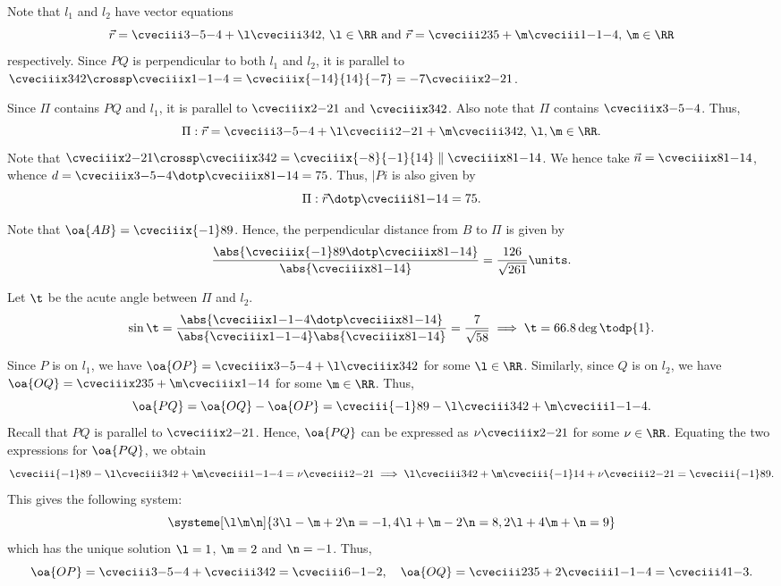 \begin{solution}
    \begin{ppart}
        Note that $l_1$ and $l_2$ have vector equations \[\vec r = \cveciii3{-5}{-4} + \l\cveciii342, \, \l \in \RR \text{ and } \vec r = \cveciii235 + \m\cveciii1{-1}{-4}, \, \m \in \RR\] respectively. Since $PQ$ is perpendicular to both $l_1$ and $l_2$, it is parallel to $\cveciiix342 \crossp \cveciiix1{-1}{-4} = \cveciiix{-14}{14}{-7} = -7\cveciiix2{-2}1$.
    \end{ppart}
    \begin{ppart}
        Since $\Pi$ contains $PQ$ and $l_1$, it is parallel to $\cveciiix2{-2}1$ and $\cveciiix342$. Also note that $\Pi$ contains $\cveciiix3{-5}{-4}$. Thus, \[\Pi : \vec r = \cveciii3{-5}{-4} + \l \cveciii2{-2}1 + \m \cveciii342, \, \l, \m \in \RR.\] Note that $\cveciiix2{-2}1 \crossp \cveciiix342 = \cveciiix{-8}{-1}{14} \parallel \cveciiix81{-14}$. We hence take $\vec n = \cveciiix81{-14}$, whence $d = \cveciiix3{-5}{-4} \dotp \cveciiix81{-14} = 75$. Thus, $|Pi$ is also given by \[\Pi: \vec r \dotp \cveciii81{-14} = 75.\]
    \end{ppart}
    \begin{ppart}
        Note that $\oa{AB} = \cveciiix{-1}89$. Hence, the perpendicular distance from $B$ to $\Pi$ is given by \[\frac{\abs{\cveciiix{-1}89 \dotp \cveciiix81{-14}}}{\abs{\cveciiix81{-14}}} = \frac{126}{\sqrt{261}} \units.\]
    \end{ppart}
    \begin{ppart}
        Let $\t$ be the acute angle between $\Pi$ and $l_2$. \[\sin\t = \frac{\abs{\cveciiix1{-1}{-4} \dotp \cveciiix81{-14}}}{\abs{\cveciiix1{-1}{-4}} \abs{\cveciiix81{-14}}} = \frac{7}{\sqrt{58}} \implies \t = 66.8 \deg \todp{1}.\]
    \end{ppart}
    \begin{ppart}
        Since $P$ is on $l_1$, we have $\oa{OP} = \cveciiix3{-5}{-4} + \l\cveciiix342$ for some $\l \in \RR$. Similarly, since $Q$ is on $l_2$, we have $\oa{OQ} = \cveciiix235 + \m\cveciiix1{-1}4$ for some $\m \in \RR$. Thus, \[\oa{PQ} = \oa{OQ} - \oa{OP} = \cveciii{-1}89 - \l\cveciii342 + \m\cveciii1{-1}{-4}.\] Recall that $PQ$ is parallel to $\cveciiix2{-2}1$. Hence, $\oa{PQ}$ can be expressed as $\nu \cveciiix2{-2}1$ for some $\nu \in \RR$. Equating the two expressions for $\oa{PQ}$, we obtain \[\cveciii{-1}89 - \l\cveciii342 + \m\cveciii1{-1}{-4} = \nu \cveciii2{-2}1 \implies \l\cveciii342 + \m\cveciii{-1}14 + \nu \cveciii2{-2}1 = \cveciii{-1}89 .\] This gives the following system:
        \[\systeme[\l\m\n]{
                3\l - \m + 2\n = -1,
                4\l + \m -2\n = 8,
                2\l + 4\m + \n = 9
        }\] which has the unique solution $\l = 1$, $\m = 2$ and $\n = -1$. Thus, \[ \oa{OP} = \cveciii3{-5}{-4} + \cveciii342 = \cveciii6{-1}{-2}, \quad \oa{OQ} = \cveciii235 + 2\cveciii1{-1}{-4} = \cveciii41{-3}.\]
    \end{ppart}
\end{solution}

